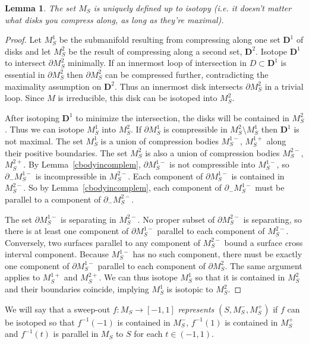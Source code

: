 \documentclass[12pt]{amsart}
\theoremstyle{plain}
\newtheorem{Lem}[Thm]{Lemma}
\theoremstyle{definition}
\begin{document}
\begin{Lem}
\label{msuniquelem}
The set $M_S$ is uniquely defined up to isotopy (i.e. it doesn't matter what disks you compress along, as long as they're maximal).
\end{Lem}

\begin{proof}
Let $M^1_S$ be the submanifold resulting from compressing along one set $\mathbf{D}^1$ of disks and let $M^2_S$ be the result of compressing along a second set, $\mathbf{D}^2$.  Isotope $\mathbf{D}^1$ to intersect $\partial M^2_S$ minimally.  If an innermost loop of intersection in $D \subset \mathbf{D}^1$ is essential in $\partial M^2_S$ then $\partial M^2_S$ can be compressed further, contradicting the maximality assumption on $\mathbf{D}^2$.  Thus an innermost disk intersects $\partial M^2_S$ in a trivial loop.  Since $M$ is irreducible, this disk can be isotoped into $M^2_S$.  

After isotoping $\mathbf{D}^1$ to minimize the intersection, the disks will be contained in $M^2_S$.  Thus we can isotope $M^1_S$ into $M^2_S$.  If $\partial M^1_S$ is compressible in $M^2_S \setminus M^1_S$ then $\mathbf{D}^1$ is not maximal.  The set $M^1_S$ is a union of compression bodies $M^{1-}_S$, $M^{1+}_S$ along their positive boundaries.  The set $M^2_S$ is also a union of compression bodies $M^{2-}_S$, $M^{2+}_S$.  By Lemma~\ref{cbodyincomplem}, $\partial M^{1-}_S$ is not compressible into $M^{1-}_S$, so $\partial_- M^{1-}_S$ is incompressible in $M^{2-}_S$.  Each component of $\partial M^{1-}_S$ is contained in $M^{2-}_S$.  So by Lemma~\ref{cbodyincomplem}, each component of $\partial_- M^{1-}_S$ must be parallel to a component of $\partial_- M^{2-}_S$.  

The set $\partial M^{1-}_S$ is separating in $M^{2-}_S$.  No proper subset of $\partial M^{2-}_S$ is separating, so there is at least one component of $\partial M^{1-}_S$ parallel to each component of $M^{2-}_S$.  Conversely, two surfaces parallel to any component of $M^{2-}_S$ bound a surface cross interval component.  Because $M^{1-}_S$ has no such component, there must be exactly one component of $\partial M^{1-}_S$ parallel to each component of $\partial M^2_S$.  The same argument applies to $M^{1+}_S$ and $M^{2+}_S$.  We can thus isotope $M^1_S$ so that it is contained in $M^2_S$ and their boundaries coincide, implying $M^1_S$ is isotopic to $M^2_S$.
\end{proof}

We will say that a sweep-out $f : M_S \rightarrow [-1,1]$ \textit{represents} $(S, M_S^-, M_S^+)$ if $f$ can be isotoped so that $f^{-1}(-1)$ is contained in $M_S^-$, $f^{-1}(1)$ is contained in $M_S^+$ and $f^{-1}(t)$ is parallel in $M_S$ to $S$ for each $t \in (-1,1)$.  
\end{document}
